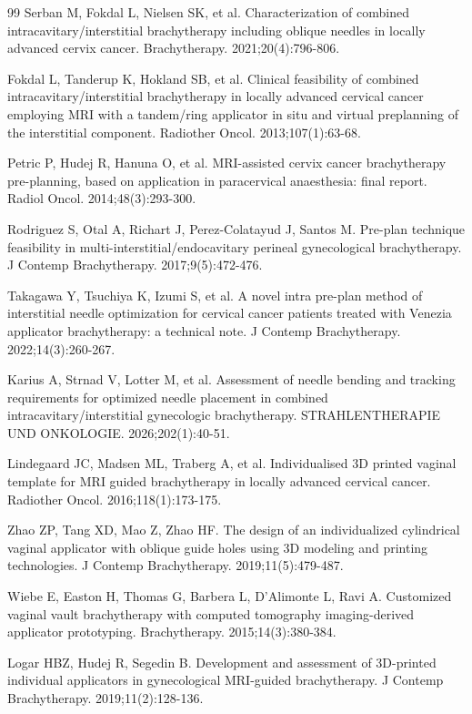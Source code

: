 \documentclass[12pt,twoside,letterpaper]{article}
\begin{document}
\begin{thebibliography}{99}
 Serban M, Fokdal L, Nielsen SK, et al. Characterization of combined intracavitary/interstitial brachytherapy including oblique needles in locally advanced cervix cancer. Brachytherapy. 2021;20(4):796-806.

 Fokdal L, Tanderup K, Hokland SB, et al. Clinical feasibility of combined intracavitary/interstitial brachytherapy in locally advanced cervical cancer employing MRI with a tandem/ring applicator in situ and virtual preplanning of the interstitial component. Radiother Oncol. 2013;107(1):63-68.

 Petric P, Hudej R, Hanuna O, et al. MRI-assisted cervix cancer brachytherapy pre-planning, based on application in paracervical anaesthesia: final report. Radiol Oncol. 2014;48(3):293-300.

 Rodriguez S, Otal A, Richart J, Perez-Colatayud J, Santos M. Pre-plan technique feasibility in multi-interstitial/endocavitary perineal gynecological brachytherapy. J Contemp Brachytherapy. 2017;9(5):472-476.

 Takagawa Y, Tsuchiya K, Izumi S, et al. A novel intra pre-plan method of interstitial needle optimization for cervical cancer patients treated with Venezia applicator brachytherapy: a technical note. J Contemp Brachytherapy. 2022;14(3):260-267.

 Karius A, Strnad V, Lotter M, et al. Assessment of needle bending and tracking requirements for optimized needle placement in combined intracavitary/interstitial gynecologic brachytherapy. STRAHLENTHERAPIE UND ONKOLOGIE. 2026;202(1):40-51.

 Lindegaard JC, Madsen ML, Traberg A, et al. Individualised 3D printed vaginal template for MRI guided brachytherapy in locally advanced cervical cancer. Radiother Oncol. 2016;118(1):173-175.

 Zhao ZP, Tang XD, Mao Z, Zhao HF. The design of an individualized cylindrical vaginal applicator with oblique guide holes using 3D modeling and printing technologies. J Contemp Brachytherapy. 2019;11(5):479-487.

 Wiebe E, Easton H, Thomas G, Barbera L, D'Alimonte L, Ravi A. Customized vaginal vault brachytherapy with computed tomography imaging-derived applicator prototyping. Brachytherapy. 2015;14(3):380-384.

 Logar HBZ, Hudej R, Segedin B. Development and assessment of 3D-printed individual applicators in gynecological MRI-guided brachytherapy. J Contemp Brachytherapy. 2019;11(2):128-136.


\end{thebibliography}
\end{document}
